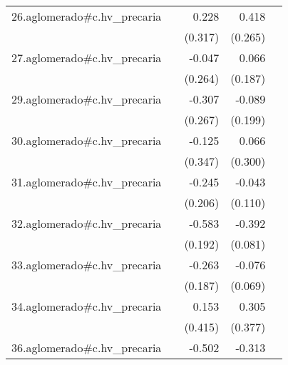 {\begin{longtable}{l*{4}{D{.}{.}{-1}}}
\addlinespace
26.aglomerado#c.hv\_precaria&                     &       0.228         &       0.418         &                     \\
            &                     &     (0.317)         &     (0.265)         &                     \\
\addlinespace
27.aglomerado#c.hv\_precaria&                     &      -0.047         &       0.066         &                     \\
            &                     &     (0.264)         &     (0.187)         &                     \\
\addlinespace
29.aglomerado#c.hv\_precaria&                     &      -0.307         &      -0.089         &                     \\
            &                     &     (0.267)         &     (0.199)         &                     \\
\addlinespace
30.aglomerado#c.hv\_precaria&                     &      -0.125         &       0.066         &                     \\
            &                     &     (0.347)         &     (0.300)         &                     \\
\addlinespace
31.aglomerado#c.hv\_precaria&                     &      -0.245         &      -0.043         &                     \\
            &                     &     (0.206)         &     (0.110)         &                     \\
\addlinespace
32.aglomerado#c.hv\_precaria&                     &      -0.583\sym{**} &      -0.392\sym{***}&                     \\
            &                     &     (0.192)         &     (0.081)         &                     \\
\addlinespace
33.aglomerado#c.hv\_precaria&                     &      -0.263         &      -0.076         &                     \\
            &                     &     (0.187)         &     (0.069)         &                     \\
\addlinespace
34.aglomerado#c.hv\_precaria&                     &       0.153         &       0.305         &                     \\
            &                     &     (0.415)         &     (0.377)         &                     \\
\addlinespace
36.aglomerado#c.hv\_precaria&                     &      -0.502\sym{*}  &      -0.313\sym{*}  &                     \\

\end{longtable}}
